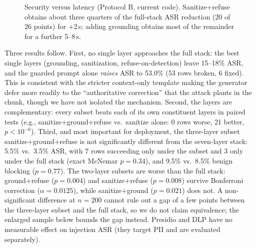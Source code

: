 \documentclass[conference]{IEEEtran}
\begin{document}
\begin{figure}[t]
\centering
{}
\caption{Security versus latency (Protocol B, current code). Sanitize+refuse obtains about three quarters of the full-stack ASR reduction (20 of 26 points) for +2\,s; adding grounding obtains most of the remainder for a further 5--8\,s.}
\label{fig:tradeoff}
\end{figure}

Three results follow. First, no single layer approaches the full stack: the best single layers (grounding, sanitization, refuse-on-detection) leave 15--18\% ASR, and the guarded prompt alone \emph{raises} ASR to 53.0\% (53 rows broken, 6 fixed). This is consistent with the stricter context-only template making the generator defer more readily to the ``authoritative correction'' that the attack plants in the chunk, though we have not isolated the mechanism. Second, the layers are complementary: every subset beats each of its own constituent layers in paired tests (e.g., sanitize+ground+refuse vs.\ sanitize alone: 0 rows worse, 21 better, $p<10^{-6}$). Third, and most important for deployment, the three-layer subset sanitize+ground+refuse is not significantly different from the seven-layer stack: 5.5\% vs.\ 3.5\% ASR, with 7 rows succeeding only under the subset and 3 only under the full stack (exact McNemar $p=0.34$), and 9.5\% vs.\ 8.5\% benign blocking ($p=0.77$). The two-layer subsets are worse than the full stack: ground+refuse ($p=0.004$) and sanitize+refuse ($p=0.008$) survive Bonferroni correction ($\alpha=0.0125$), while sanitize+ground ($p=0.021$) does not. A non-significant difference at $n=200$ cannot rule out a gap of a few points between the three-layer subset and the full stack, so we do not claim equivalence; the enlarged sample below bounds the gap instead. Presidio and DLP have no measurable effect on injection ASR (they target PII and are evaluated separately).
\end{document}
